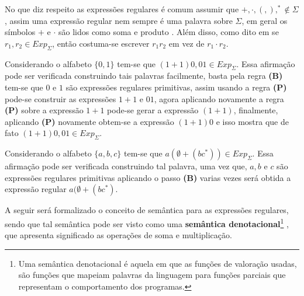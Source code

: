 No que diz respeito as expressões regulares é comum assumir que $+, \cdot, (, ), ^* \notin \Sigma$, assim uma expressão regular nem sempre é uma palavra sobre $\Sigma$, em geral os símbolos $+$ e $\cdot$ são lidos como soma e produto \cite{carroll1989}. Além disso, como dito em \cite{benjaLivro2010} se $r_1, r_2 \in Exp_\Sigma$, então costuma-se escrever $r_1r_2$ em vez de $r_1\cdot r_2$.


\begin{example}
	Considerando o alfabeto $\{0,1\}$ tem-se que $(1 + 1)0, 01 \in Exp_\Sigma$. Essa afirmação pode ser verificada construindo tais palavras facilmente, basta pela regra \textbf{(B)} tem-se que  $0$ e $1$ são expressões regulares primitivas, assim usando a regra \textbf{(P)} pode-se construir as expressões $1 + 1$ e $01$, agora aplicando novamente a regra \textbf{(P)} sobre a expressão $1 + 1$ pode-se gerar a expressão $(1 + 1)$, finalmente, aplicando \textbf{(P)} novamente obtem-se a expressão $(1+1)0$ e isso mostra que de fato $(1 + 1)0, 01 \in Exp_\Sigma$.
\end{example}

\begin{example}
	Considerando o alfabeto $\{a, b, c\}$ tem-se que $a(\emptyset + (bc^*)) \in Exp_\Sigma$. Essa afirmação pode ser verificada construindo tal palavra, uma vez que, $a, b$ e $c$ são expressões regulares primitivas aplicando o passo \textbf{(B)} varias vezes será obtida a expressão regular $a(\emptyset + (bc^*)$.
\end{example}

A seguir será formalizado o conceito de semântica para as expressões regulares, sendo que tal semântica pode ser visto como uma \textbf{semântica denotacional}\footnote{Uma semântica denotacional é aquela em que as funções de valoração usadas, são funções que mapeiam palavras da linguagem para funções parciais que representam o comportamento dos programas.} \cite{scott1971}, que apresenta significado as operações de soma e multiplicação.


